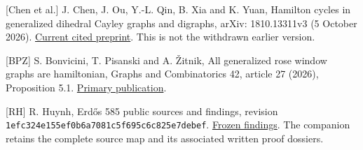 \documentclass[
  11pt,
]{article}
\begin{document}
{[}Chen et al.{]} J. Chen, J. Ou, Y.-L. Qin, B. Xia and K. Yuan,
Hamilton cycles in generalized dihedral Cayley graphs and digraphs,
arXiv: 1810.13311v3 (5 October 2026).
\href{https://arxiv.org/html/1810.13311v3}{Current cited preprint}. This
is not the withdrawn earlier version.

{[}BPZ{]} S. Bonvicini, T. Pisanski and A. Žitnik, All generalized rose
window graphs are hamiltonian, Graphs and Combinatorics 42, article 27
(2026), Proposition 5.1.
\href{https://doi.org/10.1007/s00373-026-03016-w}{Primary publication}.

{[}RH{]} R. Huynh, Erdős 585 public sources and findings, revision
\texttt{1efc324e155ef0b6a7081c5f695c6c825e7debef}.
\href{https://github.com/roberthuynh/erdos-585/blob/1efc324e155ef0b6a7081c5f695c6c825e7debef/findings/FINDINGS.md}{Frozen
findings}. The companion retains the complete source map and its
associated written proof dossiers.
\end{document}
